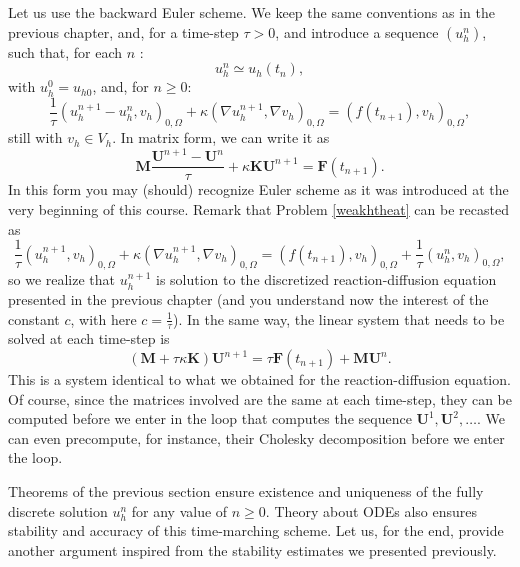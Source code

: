 \documentclass{article}
\begin{document}
Let us use the backward Euler scheme.
We keep the same conventions as in the previous chapter, and, for a time-step $\tau > 0$, and introduce a sequence $(u_h^n)$, such that, for each $n$ :
\[
u_h^n \simeq u_h ( t_n ),
\]
with $u_h^0 = u_{h0}$, and, for $n\geq0$:
\begin{equation}
    \label{weakhtheat}
    \frac{1}{\tau} (u_h^{n+1} - u_h^n,v_h)_{0,\Omega} 
    + \kappa (\nabla u_h^{n+1}, \nabla v_h)_{0,\Omega} = (f(t_{n+1}),v_h)_{0,\Omega}, %
\end{equation}
still with $v_h \in V_h$. In matrix form, we can write it as
\begin{equation}
    \label{FEMmatrixHeatBE}
    \mathbf{M} \frac{\mathbf{U}^{n+1}-\mathbf{U}^n}{\tau} + \kappa \mathbf{K} \mathbf{U}^{n+1} = \mathbf{F} (t_{n+1}).
\end{equation}
In this form you may (should) recognize Euler scheme as it was introduced at the very beginning of this course.
Remark that Problem \eqref{weakhtheat} can be recasted as
\begin{equation}
    \label{weakhtheatbis}
    \frac{1}{\tau} (u_h^{n+1} , v_h)_{0,\Omega} 
    + \kappa (\nabla u_h^{n+1}, \nabla v_h)_{0,\Omega} = (f(t_{n+1}),v_h)_{0,\Omega}
    + \frac{1}{\tau} (u_h^n,v_h)_{0,\Omega} , %
\end{equation}
so we realize that $u_h^{n+1}$ is solution to the discretized reaction-diffusion equation presented in the previous chapter (and you understand now the interest of the constant $c$, with here $c=\frac{1}{\tau}$). In the same way, the linear system that needs to be solved at each time-step is 
\begin{equation}
    \label{FEMmatrixHeatBEbis}
    \left ( \mathbf{M}  + \tau \kappa \mathbf{K} \right ) \mathbf{U}^{n+1} = \tau \mathbf{F} (t_{n+1}) + {\mathbf{M} \mathbf{U}^n}.
\end{equation}
This is a system identical to what we obtained for the reaction-diffusion equation. Of course, since the matrices involved are the same at each time-step, they can be computed before we enter in the loop that computes the sequence $\mathbf{U}^1,\mathbf{U}^2,\dots$. We can even precompute, for instance, their Cholesky decomposition before we enter the loop.

Theorems of the previous section ensure existence and uniqueness of the fully discrete solution $u_h^n$ for any value of $n\geq 0$. Theory about ODEs also ensures stability and accuracy of this time-marching scheme. Let us, for the end, provide another argument inspired from the stability estimates we presented previously.
\end{document}
